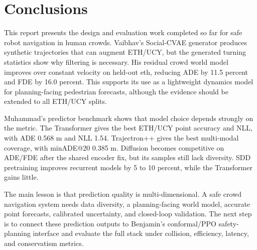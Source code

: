 \documentclass[conference]{IEEEtran}
\begin{document}
\section{Conclusions}

This report presents the design and evaluation work completed so far for safe
robot navigation in human crowds. Vaibhav's Social-CVAE generator produces
synthetic trajectories that can augment ETH/UCY, but the generated turning
statistics show why filtering is necessary. His residual crowd world model
improves over constant velocity on held-out eth, reducing ADE by 11.5 percent
and FDE by 16.0 percent. This supports its use as a lightweight dynamics model
for planning-facing pedestrian forecasts, although the evidence should be extended
to all ETH/UCY splits.

Muhammad's predictor benchmark shows that model choice depends strongly on the
metric. The Transformer gives the best ETH/UCY point accuracy and NLL, with ADE
0.568 m and NLL 1.54. Trajectron++ gives the best multi-modal coverage, with
minADE@20 0.385 m. Diffusion becomes competitive on ADE/FDE after the shared
encoder fix, but its samples still lack diversity. SDD pretraining improves
recurrent models by 5 to 10 percent, while the Transformer gains little.

The main lesson is that prediction quality is multi-dimensional. A safe crowd
navigation system needs data diversity, a planning-facing world model,
accurate point forecasts, calibrated uncertainty, and closed-loop validation.
The next step is to connect these prediction outputs to Benjamin's
conformal/PPO safety-planning interface and evaluate the full stack under
collision, efficiency, latency, and conservatism metrics.



\end{document}
